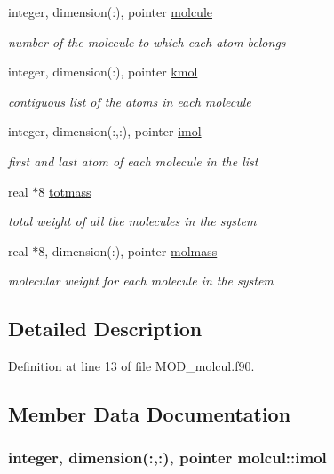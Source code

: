 \begin{DoxyCompactItemize}
integer, dimension(\-:), pointer \hyperlink{classmolcul_a392adc76fde1d59a6a1e83c5df1c579e}{molcule}
\begin{DoxyCompactList}\small\item\em number of the molecule to which each atom belongs \end{DoxyCompactList}\item 
integer, dimension(\-:), pointer \hyperlink{classmolcul_a68ecb576dc71334e7f535677a9dc3c76}{kmol}
\begin{DoxyCompactList}\small\item\em contiguous list of the atoms in each molecule \end{DoxyCompactList}\item 
integer, dimension(\-:,\-:), pointer \hyperlink{classmolcul_a41c6859685f9066e79f213be0050aaa8}{imol}
\begin{DoxyCompactList}\small\item\em first and last atom of each molecule in the list \end{DoxyCompactList}\item 
real $\ast$8 \hyperlink{classmolcul_a76ebf02e788b2fc31b96c58c63d07222}{totmass}
\begin{DoxyCompactList}\small\item\em total weight of all the molecules in the system \end{DoxyCompactList}\item 
real $\ast$8, dimension(\-:), pointer \hyperlink{classmolcul_a7e75c1830e47e428055595f4c8772207}{molmass}
\begin{DoxyCompactList}\small\item\em molecular weight for each molecule in the system \end{DoxyCompactList}\end{DoxyCompactItemize}


\subsection{Detailed Description}


Definition at line 13 of file M\-O\-D\-\_\-molcul.\-f90.



\subsection{Member Data Documentation}
\hypertarget{classmolcul_a41c6859685f9066e79f213be0050aaa8}{
\subsubsection[{imol}]{\setlength{\rightskip}{0pt plus 5cm}integer, dimension(\-:,\-:), pointer molcul\-::imol}}\label{classmolcul_a41c6859685f9066e79f213be0050aaa8}


